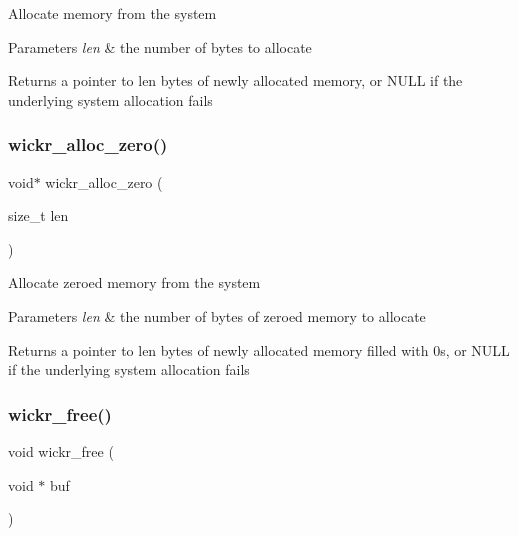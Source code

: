 Allocate memory from the system


\begin{DoxyParams}{Parameters}
{\em len} & the number of bytes to allocate \\
\hline
\end{DoxyParams}
\begin{DoxyReturn}{Returns}
a pointer to \textquotesingle{}len\textquotesingle{} bytes of newly allocated memory, or N\+U\+LL if the underlying system allocation fails 
\end{DoxyReturn}
\mbox{\label{group__memory__functions_ga8163f2ae01a21e319806fbba9b9da00a}} 
\subsubsection{\texorpdfstring{wickr\_alloc\_zero()}{wickr\_alloc\_zero()}}
{\footnotesize\ttfamily void$\ast$ wickr\+\_\+alloc\+\_\+zero (\begin{DoxyParamCaption}\item[{size\+\_\+t}]{len }\end{DoxyParamCaption})}

Allocate zeroed memory from the system


\begin{DoxyParams}{Parameters}
{\em len} & the number of bytes of zeroed memory to allocate \\
\hline
\end{DoxyParams}
\begin{DoxyReturn}{Returns}
a pointer to \textquotesingle{}len\textquotesingle{} bytes of newly allocated memory filled with 0s, or N\+U\+LL if the underlying system allocation fails 
\end{DoxyReturn}
\mbox{\label{group__memory__functions_ga0ec3692f8dc5c2df128743c515d300c1}} 
\subsubsection{\texorpdfstring{wickr\_free()}{wickr\_free()}}
{\footnotesize\ttfamily void wickr\+\_\+free (\begin{DoxyParamCaption}\item[{void $\ast$}]{buf }\end{DoxyParamCaption})}

